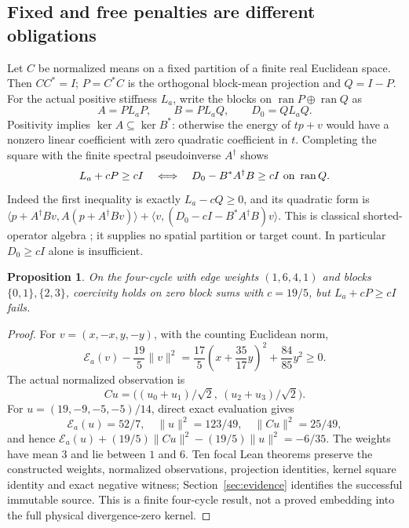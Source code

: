 \documentclass[11pt]{article}
\newtheorem{proposition}{Proposition}
\newcommand{\E}{\mathcal E}
\begin{document}
\subsection{Fixed and free penalties are different obligations}
Let $C$ be normalized means on a fixed partition of a finite real Euclidean space.
Then $CC^*=I$; $P=C^*C$ is the orthogonal block-mean projection and $Q=I-P$.
For the actual positive stiffness $L_a$, write the blocks on
$\operatorname{ran}P\oplus\operatorname{ran}Q$ as
\[
 A=PL_aP,\qquad B=PL_aQ,\qquad D_0=QL_aQ.
\]
Positivity implies $\ker A\subseteq\ker B^*$: otherwise the energy of $tp+v$
would have a nonzero linear coefficient with zero quadratic coefficient in $t$.
Completing the square with the finite spectral pseudoinverse $A^\dagger$ shows
\begin{equation}\label{eq:shorted}
 L_a+cP\geq cI\quad\Longleftrightarrow\quad
 D_0-B^*A^\dagger B\geq cI\ \hbox{on }\operatorname{ran}Q.
\end{equation}
Indeed the first inequality is exactly $L_a-cQ\geq0$, and its quadratic form is
$\langle p+A^\dagger Bv,A(p+A^\dagger Bv)\rangle+
\langle v,(D_0-cI-B^*A^\dagger B)v\rangle$.
This is classical shorted-operator algebra \cite{anderson}; it supplies no spatial
partition or target count. In particular $D_0\geq cI$ alone is insufficient.

\begin{proposition}\label{prop:formal-cycle}
On the four-cycle with edge weights $(1,6,4,1)$ and blocks $\{0,1\},\{2,3\}$,
coercivity holds on zero block sums with $c=19/5$, but $L_a+cP\geq cI$ fails.
\end{proposition}
\begin{proof}
For $v=(x,-x,y,-y)$, with the counting Euclidean norm,
\[
 \E_a(v)-\frac{19}{5}\|v\|^2
 =\frac{17}{5}\left(x+\frac{35}{17}y\right)^2+\frac{84}{85}y^2\geq0.
\]
The actual normalized observation is
\[
 Cu=\bigl((u_0+u_1)/\sqrt2,\ (u_2+u_3)/\sqrt2\bigr).
\]
For $u=(19,-9,-5,-5)/14$, direct exact evaluation gives
\[
 \E_a(u)=52/7,\quad\|u\|^2=123/49,\quad\|Cu\|^2=25/49,
\]
and hence $\E_a(u)+(19/5)\|Cu\|^2-(19/5)\|u\|^2=-6/35$.
The weights have mean $3$ and lie between $1$ and $6$. Ten focal Lean theorems
preserve the constructed weights, normalized observations, projection identities,
kernel square identity and exact negative witness; Section~\ref{sec:evidence}
identifies the successful immutable source. This is a finite four-cycle result,
not a proved embedding into the full physical divergence-zero kernel.
\end{proof}
\end{document}
